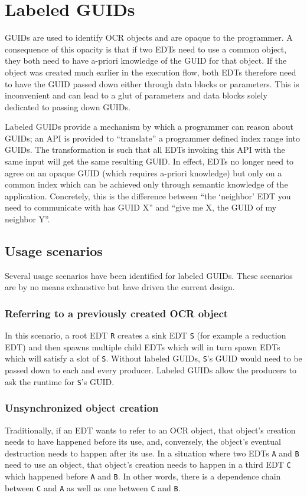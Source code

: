 \section{Labeled GUIDs}
GUIDs are used to identify OCR objects and are opaque to the
programmer. A consequence of this opacity is that if two EDTs need to
use a common object, they both need to have a-priori knowledge of the
GUID for that object. If the object was created much earlier in the
execution flow, both EDTs therefore need to have the GUID passed down
either through data blocks or parameters. This is inconvenient and can
lead to a glut of parameters and data blocks solely dedicated to
passing down GUIDs.

Labeled GUIDs provide a mechanism by which a programmer can
reason about GUIDs; an API is provided to ``translate'' a programmer
defined index range into GUIDs. The transformation is such that all
EDTs invoking this API with the same input will get the same resulting
GUID. In effect, EDTs no longer need to agree on an opaque GUID (which
requires a-priori knowledge) but only on a common index which can be
achieved only through semantic knowledge of the
application. Concretely, this is the difference between ``the
`neighbor' EDT you need to communicate with has GUID X'' and
``give me X, the GUID of my neighbor Y''.
\subsection{Usage scenarios}
Several usage scenarios have been identified for labeled GUIDs. These
scenarios are by no means exhaustive but have driven the current
design.
\subsubsection{Referring to a previously created OCR object}
In this scenario, a root EDT \texttt{R} creates a sink EDT \texttt{S}
(for example a reduction EDT) and then spawns multiple child
EDTs which will in turn spawn EDTs which will satisfy a slot of
\texttt{S}. Without labeled GUIDs, \texttt{S}'s GUID would need to be
passed down to each and every producer. Labeled GUIDs allow the
producers to ask the runtime for \texttt{S}'s GUID.
\subsubsection{Unsynchronized object creation}
Traditionally, if an EDT wants to refer to an OCR object, that
object's creation needs to have happened before its use, and,
conversely, the object's eventual destruction needs to happen after
its use. In a situation where two EDTs \texttt{A} and \texttt{B}
need to use an object, that object's creation needs to happen in a
third EDT \texttt{C} which happened before \texttt{A} and
\texttt{B}. In other words, there is a dependence chain between
\texttt{C} and \texttt{A} as well as one between \texttt{C} and
\texttt{B}.

